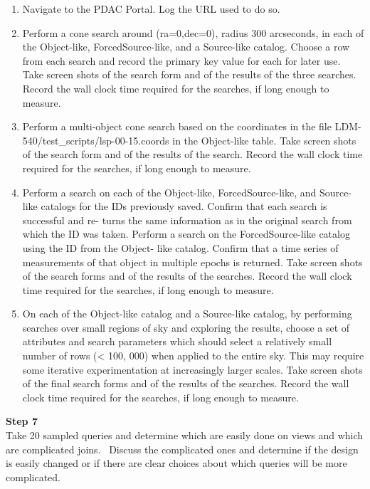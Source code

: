 \begin{enumerate}
\tightlist
\item
  Navigate to the PDAC Portal. Log the URL used to do so.
\item
  Perform a cone search around (ra=0,dec=0), radius 300 arcseconds, in
  each of the Object-like, ForcedSource-like, and a Source-like catalog.
  Choose a row from each search and record the primary key value for
  each for later use. Take screen shots of the search form and of the
  results of the three searches. Record the wall clock time required for
  the searches, if long enough to measure.
\item
  Perform a multi-object cone search based on the coordinates in the
  file LDM-540/test\_scripts/lsp-00-15.coords in the Object-like table.
  Take screen shots of the search form and of the results of the search.
  Record the wall clock time required for the searches, if long enough
  to measure.
\item
  Perform a search on each of the Object-like, ForcedSource-like, and
  Source-like catalogs for the IDs previously saved. Confirm that each
  search is successful and re- turns the same information as in the
  original search from which the ID was taken. Perform a search on the
  ForcedSource-like catalog using the ID from the Object- like catalog.
  Confirm that a time series of measurements of that object in multiple
  epochs is returned. Take screen shots of the search forms and of the
  results of the searches. Record the wall clock time required for the
  searches, if long enough to measure.
\item
  On each of the Object-like catalog and a Source-like catalog, by
  performing searches over small regions of sky and exploring the
  results, choose a set of attributes and search parameters which should
  select a relatively small number of rows (\textless{} 100, 000) when
  applied to the entire sky. This may require some iterative
  experimentation at increasingly larger scales. Take screen shots of
  the final search forms and of the results of the searches. Record the
  wall clock time required for the searches, if long enough to measure.
\end{enumerate}

\textbf{Step 7}\\
{Take 20 sampled queries and determine which are easily done on views
and which are complicated joins. ~Discuss the complicated ones and
determine if the design is easily changed or if there are clear choices
about which queries will be more complicated.}\\
~\\

